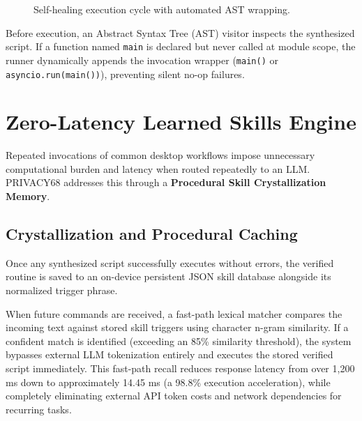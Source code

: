 \documentclass[conference]{IEEEtran}
\begin{document}
\begin{figure}[htbp]
\centering
{}
\caption{Self-healing execution cycle with automated AST wrapping.}
\label{fig:self_healing_algo}
\end{figure}

Before execution, an Abstract Syntax Tree (AST) visitor inspects the synthesized script. If a function named \texttt{main} is declared but never called at module scope, the runner dynamically appends the invocation wrapper (\texttt{main()} or \texttt{asyncio.run(main())}), preventing silent no-op failures.

\section{Zero-Latency Learned Skills Engine}
\label{sec:skills}
Repeated invocations of common desktop workflows impose unnecessary computational burden and latency when routed repeatedly to an LLM. PRIVACY68 addresses this through a \textbf{Procedural Skill Crystallization Memory}.

\subsection{Crystallization and Procedural Caching}
Once any synthesized script successfully executes without errors, the verified routine is saved to an on-device persistent JSON skill database alongside its normalized trigger phrase.

When future commands are received, a fast-path lexical matcher compares the incoming text against stored skill triggers using character n-gram similarity. If a confident match is identified (exceeding an 85\% similarity threshold), the system bypasses external LLM tokenization entirely and executes the stored verified script immediately. This fast-path recall reduces response latency from over 1,200 ms down to approximately 14.45 ms (a 98.8\% execution acceleration), while completely eliminating external API token costs and network dependencies for recurring tasks.
\end{document}
